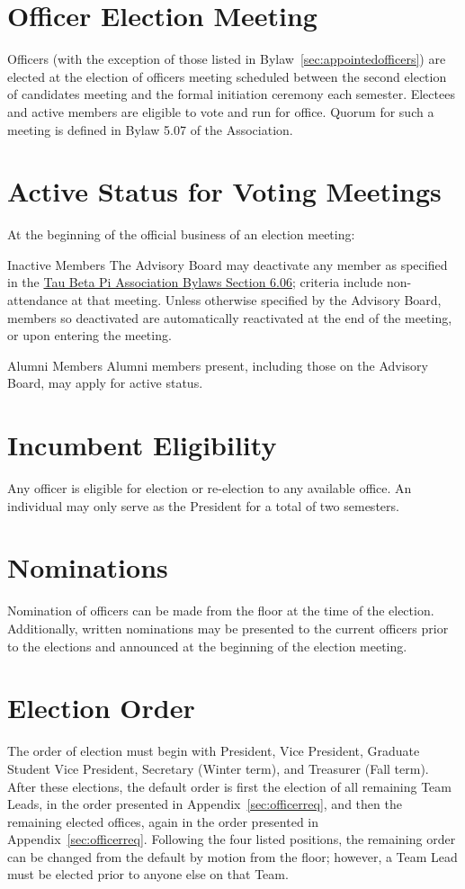 \section{Officer Election Meeting}\label{sec:elecMeeting} Officers (with the exception of those listed in Bylaw~\ref{sec:appointedofficers}) are elected at the election 
of officers meeting scheduled between the second election of candidates meeting and the formal initiation ceremony each semester. Electees and active members are eligible to vote and run for office. Quorum for such a meeting is defined in Bylaw 5.07 of the Association.
\section{Active Status for Voting Meetings}\label{sec:elecQuorum} At the beginning of the official business of an election meeting:
\begin{enumsubsection}
\item*{Inactive Members} The Advisory Board may deactivate any member as specified in the  \href{http://www.tbp.org/off/ConstBylaw.pdf}{Tau Beta Pi Association Bylaws Section 6.06}; criteria include non-attendance at that meeting. Unless otherwise specified by the Advisory Board,
members so deactivated are automatically reactivated at the end of the meeting, or upon entering the meeting.
\item*{Alumni Members} Alumni members present, including those on the Advisory Board, may apply for active status.
\end{enumsubsection}
\section{Incumbent Eligibility} Any officer is eligible for election or re-election to any available office. An individual may only serve as the President for a total of two semesters.
\section{Nominations} Nomination of officers can be made from the floor at the time of the election.  Additionally, written nominations may be presented to the current officers prior to the elections and announced at the beginning of the election meeting.
\section{Election Order} The order of election must begin with President, Vice President, Graduate Student Vice President, Secretary (Winter term), and Treasurer (Fall term). After these elections, the default order is first the election of all remaining Team Leads, in the order presented in Appendix~\ref{sec:officerreq}, and then the remaining elected offices, again in the order presented in Appendix~\ref{sec:officerreq}. Following the four listed positions, the remaining order can be changed from the default by motion from the floor; however, a Team Lead must be elected prior to anyone else on that Team.
